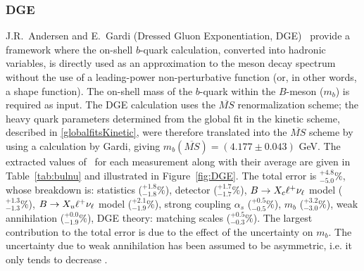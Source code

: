 \subsubsection{DGE}
J.R.~Andersen and E.~Gardi (Dressed Gluon Exponentiation, DGE)~\cite{ref:DGE} provide
a framework where the on-shell $b$-quark calculation, converted into hadronic variables, is
directly used as an approximation to the meson decay spectrum without
the use of a leading-power non-perturbative function (or, in other words,
a shape function). The on-shell mass of the $b$-quark within the $B$-meson ($m_b$) is
required as input. 
The DGE calculation uses the $\overline{MS}$ renormalization scheme; the heavy quark parameters determined  
from the global fit in the kinetic scheme, described in \ref{globalfitsKinetic}, were therefore 
translated into the $\overline{MS}$ scheme by using a calculation by Gardi, giving 
$m_b({\overline{MS}})=(4.177 \pm 0.043)$ GeV.
The extracted values
of \vub\, for each measurement along with their average are given in
Table~\ref{tab:bulnu} and illustrated in Figure~\ref{fig:DGE}.
The total error is $^{+4.8}_{-5.0}\%$, whose breakdown is:
statistics ($^{+1.8}_{-1.8}\%$),
detector ($^{+1.7}_{-1.7}\%$),
$B\to X_c \ell^+ \nu_\ell$ model ($^{+1.3}_{-1.3}\%$),
$B\to X_u \ell^+ \nu_\ell$ model ($^{+2.1}_{-1.9}\%$),
strong coupling $\alpha_s$ ($^{+0.5}_{-0.5}\%$),
$m_b$ ($^{+3.2}_{-3.0}\%$),
weak annihilation ($^{+0.0}_{-1.9}\%$),
DGE theory: matching scales ($^{+0.5}_{-0.3}\%$).
The largest contribution to the total error is due to the effect of the uncertainty 
on $m_b$. 
The uncertainty due to 
weak annihilation has been assumed to be asymmetric, i.e. it only tends to decrease \vub.

